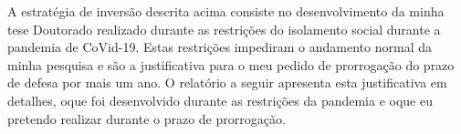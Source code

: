 A estratégia de inversão descrita acima consiste no desenvolvimento da minha tese Doutorado
realizado durante as restrições do isolamento social durante a pandemia de CoVid-19. Estas
restrições impediram o andamento normal da minha pesquisa e são a justificativa para o meu
pedido de prorrogação do prazo de defesa por mais um ano. O relatório a seguir apresenta 
esta justificativa em detalhes, oque foi desenvolvido durante as restrições da pandemia
e oque eu pretendo realizar durante o prazo de prorrogação.



